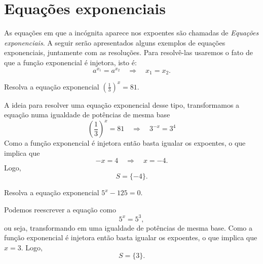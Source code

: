 \section{Equações exponenciais}

As equações em que a incógnita aparece nos expoentes são chamadas de
\emph{Equações exponenciais}.
A seguir serão apresentados alguns exemplos de
equações exponenciais, juntamente com as resoluções.
Para resolvê-las usaremos o fato de que a função exponencial é injetora,
isto é:
\[
  a^{x_1} = a^{x_2}
  \quad\Rightarrow\quad
  x_1 = x_2.
\]

\begin{example}
  Resolva a equação exponencial \(\left( \frac{1}{3} \right)^x = 81\).

  \solution
  A ideia para resolver uma equação exponencial desse tipo, transformamos
  a equação numa igualdade de potências de mesma base
  \[
    \left( \frac{1}{3}\right)^x = 81
    \quad\Rightarrow\quad
    3^{-x} = 3^4
  \]
  Como a função exponencial é injetora então basta igualar os expoentes,
  o que implica que
  \[
    -x = 4
    \quad\Rightarrow\quad
    x = -4.
  \]
  Logo,
  \[
    S = \{ -4 \}.
  \]
\end{example}

\begin{example}
  Resolva a equação exponencial \(5^x-125=0\).

  \solution
  Podemos reescrever a equação como
  \[
    5^x = 5^3,
  \]
  ou seja, transformando em uma igualdade de potências de mesma base.
  Como a função exponencial é injetora então basta igualar os expoentes,
  o que implica que $x=3$.
  Logo,
  \[
    S = \{ 3 \}.
  \]
\end{example}


